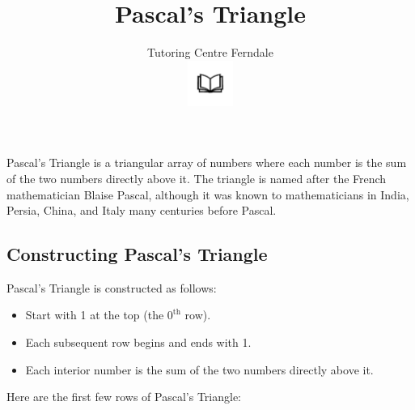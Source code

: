 \documentclass[12pt]{article}
\title{\textbf{Pascal's Triangle}}
\author{Tutoring Centre Ferndale\\
\includegraphics[width=4em]{ApS_logo.png}}
\date{}
\begin{document}
\maketitle

Pascal's Triangle is a triangular array of numbers where each number is the sum of the two numbers directly above it. The triangle is named after the French mathematician Blaise Pascal, although it was known to mathematicians in India, Persia, China, and Italy many centuries before Pascal.

\subsection*{Constructing Pascal's Triangle}

Pascal's Triangle is constructed as follows:
\begin{itemize}
    \item Start with 1 at the top (the $0^{\text{th}}$ row).
    \item Each subsequent row begins and ends with 1.
    \item Each interior number is the sum of the two numbers directly above it.
\end{itemize}

Here are the first few rows of Pascal's Triangle:
\end{document}
